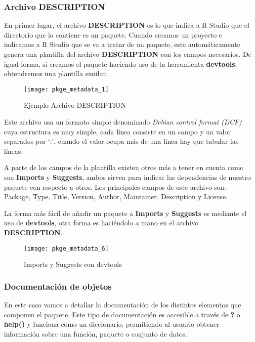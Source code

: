 \subsubsection{Archivo DESCRIPTION}

En primer lugar, el archivo \textbf{DESCRIPTION} es lo que indica a R Studio que el directorio que lo
contiene es un paquete. Cuando creamos un proyecto e indicamos a R Studio que se va a
tratar de un paquete, este autom\'aticamente genera una plantilla del archivo \textbf{DESCRIPTION}
con los campos necesarios. De igual forma, si creamos el paquete haciendo uso de la herramienta \textbf{devtools}, obtendremos
una plantilla similar.

\begin{figure}[H]
    \centering
    \texttt{[image: pkge\_metadata\_1]}
    \caption{Ejemplo Archivo DESCRIPTION }
    \label{fig:description}
\end{figure}

Este archivo usa un formato simple denominado \textit{Debian control format (DCF)} cuya estructura
es muy simple, cada l\'inea consiste en un campo y un valor separados por \enquote*{:}, cuando el valor
ocupa m\'as de una l\'inea hay que tabular las l\'ineas.

A parte de los campos de la plantilla existen otros m\'as a tener en cuenta como son \textbf{Imports}
y \textbf{Suggests}, ambos sirven para indicar las dependencias de nuestro paquete con respecto a otros.
Los principales campos de este archivo son: Package, Type, Title, Version, Author, Maintainer, Description y License.

La forma m\'as f\'acil de a\~nadir un paquete a \textbf{Imports} y \textbf{Suggests} es mediante el uso de
\textbf{devtools}, otra forma es haci\'endolo a mano en el archivo \textbf{DESCRIPTION}.

\begin{figure}[H]
    \centering
    \texttt{[image: pkge\_metadata\_6]}
    \caption{Imports y Suggests con devtools }
    \label{fig:import_suggest}
\end{figure}

\subsubsection{Documentaci\'on de objetos}

En este caso vamos a detallar la documentaci\'on de los distintos elementos que componen el
paquete.
Este tipo de documentaci\'on es accesible a trav\'es de \textbf{?} o \textbf{help()} y funciona como un
diccionario, permitiendo al usuario obtener informaci\'on sobre una funci\'on, paquete o conjunto
de datos.\\

